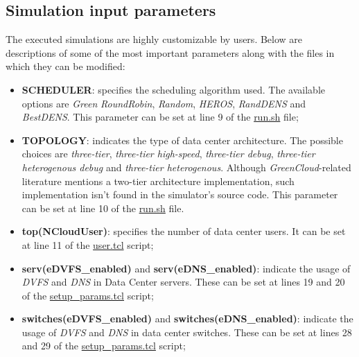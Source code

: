 \subsection{Simulation input parameters}
The executed simulations are highly customizable by users. Below are descriptions of some of the most important parameters along with the files in which they can be modified:
\begin{itemize}
    \item \textbf{SCHEDULER}: specifies the scheduling algorithm used. The available options are \emph{Green} \emph{RoundRobin}, \emph{Random}, \emph{HEROS}, \emph{RandDENS} and \emph{BestDENS}. This parameter can be set at line 9 of the \href{https://github.com/vincenzo-emanuele/masters-degree-thesis/tree/main/greencloud\_modified\_src/run.sh}{run.sh} file;
    \item \textbf{TOPOLOGY}: indicates the type of data center architecture. The possible choices are \emph{three-tier}, \emph{three-tier high-speed}, \emph{three-tier debug}, \emph{three-tier heterogenous debug} and \emph{three-tier heterogenous}. Although \emph{GreenCloud}-related literature mentions a two-tier architecture implementation, such implementation isn't found in the simulator's source code. This parameter can be set at line 10 of the \href{https://github.com/vincenzo-emanuele/masters-degree-thesis/tree/main/greencloud\_modified\_src/run.sh}{run.sh} file.
    \item \textbf{top(NCloudUser)}: specifies the number of data center users. It can be set at line 11 of the \href{https://github.com/vincenzo-emanuele/masters-degree-thesis/blob/main/greencloud_modified_src/scripts/user.tcl}{user.tcl} script;
    \item \textbf{serv(eDVFS\_enabled)} and \textbf{serv(eDNS\_enabled)}: indicate the usage of \emph{DVFS} and \emph{DNS} in Data Center servers. These can be set at lines 19 and 20 of the \href{https://github.com/vincenzo-emanuele/masters-degree-thesis/blob/main/greencloud\_modified\_src/scripts/setup\_params.tcl}{setup\_params.tcl} script;
    \item \textbf{switches(eDVFS\_enabled)} and \textbf{switches(eDNS\_enabled)}: indicate the usage of \emph{DVFS} and \emph{DNS} in data center switches. These can be set at lines 28 and 29 of the \href{https://github.com/vincenzo-emanuele/masters-degree-thesis/blob/main/greencloud\_modified\_src/scripts/setup\_params.tcl}{setup\_params.tcl} script;

\end{itemize}
